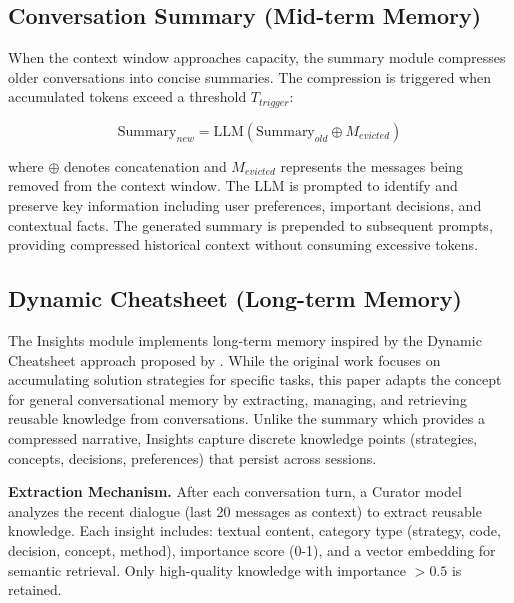 \documentclass{article} %
\begin{document}
\subsection{Conversation Summary (Mid-term Memory)}
\label{sec:summary}

When the context window approaches capacity, the summary module compresses older conversations into concise summaries. The compression is triggered when accumulated tokens exceed a threshold $T_{trigger}$:

$$\text{Summary}_{new} = \text{LLM}(\text{Summary}_{old} \oplus M_{evicted})$$

where $\oplus$ denotes concatenation and $M_{evicted}$ represents the messages being removed from the context window. The LLM is prompted to identify and preserve key information including user preferences, important decisions, and contextual facts. The generated summary is prepended to subsequent prompts, providing compressed historical context without consuming excessive tokens.

\subsection{Dynamic Cheatsheet (Long-term Memory)}
\label{sec:dynamic_cheatsheet}

The Insights module implements long-term memory inspired by the Dynamic Cheatsheet approach proposed by \citet{banerjee2024dynamic}. While the original work focuses on accumulating solution strategies for specific tasks, this paper adapts the concept for general conversational memory by extracting, managing, and retrieving reusable knowledge from conversations. Unlike the summary which provides a compressed narrative, Insights capture discrete knowledge points (strategies, concepts, decisions, preferences) that persist across sessions.

\textbf{Extraction Mechanism.} After each conversation turn, a Curator model analyzes the recent dialogue (last 20 messages as context) to extract reusable knowledge. Each insight includes: textual content, category type (strategy, code, decision, concept, method), importance score (0-1), and a vector embedding for semantic retrieval. Only high-quality knowledge with importance $> 0.5$ is retained.
\end{document}
